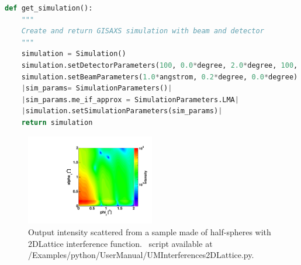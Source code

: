 \begin{lstlisting}[language=python, style=eclipseboxed,numbers=none,nolol]
def get_simulation():
    """
    Create and return GISAXS simulation with beam and detector
    """
    simulation = Simulation()
    simulation.setDetectorParameters(100, 0.0*degree, 2.0*degree, 100, 0.0*degree, 2.0*degree)
    simulation.setBeamParameters(1.0*angstrom, 0.2*degree, 0.0*degree)
    |sim_params= SimulationParameters()|
    |sim_params.me_if_approx = SimulationParameters.LMA|
    |simulation.setSimulationParameters(sim_params)|
    return simulation
\end{lstlisting}


\begin{figure}[h]
\begin{center}
\includegraphics[width=0.5\textwidth]{Figures/HSphere_2Dlattice}
\end{center}
\caption{Output intensity scattered from a sample made of half-spheres with 2DLattice interference function. \Python\ script available at {/Examples/python/UserManual/UMInterferences2DLattice.py}.}
\label{fig:2dlatticeintensity}
\end{figure}

\FloatBarrier

\newpage{\cleardoublepage}
